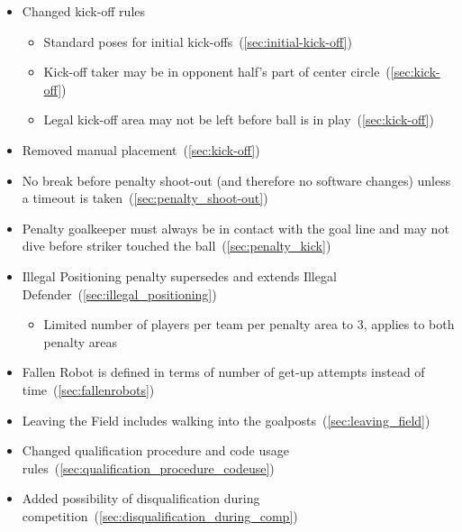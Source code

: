 \begin{itemize}
\begin{itemize}
    \end{itemize}
    \item Changed kick-off rules
    \begin{itemize}
        \item Standard poses for initial kick-offs~(\cref{sec:initial-kick-off})
        \item Kick-off taker may be in opponent half's part of center circle~(\cref{sec:kick-off})
        \item Legal kick-off area may not be left before ball is in play~(\cref{sec:kick-off})
    \end{itemize}
    \item Removed manual placement~(\cref{sec:kick-off})
    \item No break before penalty shoot-out (and therefore no software changes) unless a timeout is taken~(\cref{sec:penalty_shoot-out})
    \item Penalty goalkeeper must always be in contact with the goal line and may not dive before striker touched the ball~(\cref{sec:penalty_kick})
    \item Illegal Positioning penalty supersedes and extends Illegal Defender~(\cref{sec:illegal_positioning})
    \begin{itemize}
        \item Limited number of players per team per penalty area to 3, applies to both penalty areas
    \end{itemize}
    \item Fallen Robot is defined in terms of number of get-up attempts instead of time~(\cref{sec:fallenrobots})
    \item Leaving the Field includes walking into the goalposts~(\cref{sec:leaving_field})
    \item Changed qualification procedure and code usage rules~(\cref{sec:qualification_procedure_codeuse})
    \item Added possibility of disqualification during competition~(\cref{sec:disqualification_during_comp})
\end{itemize}
